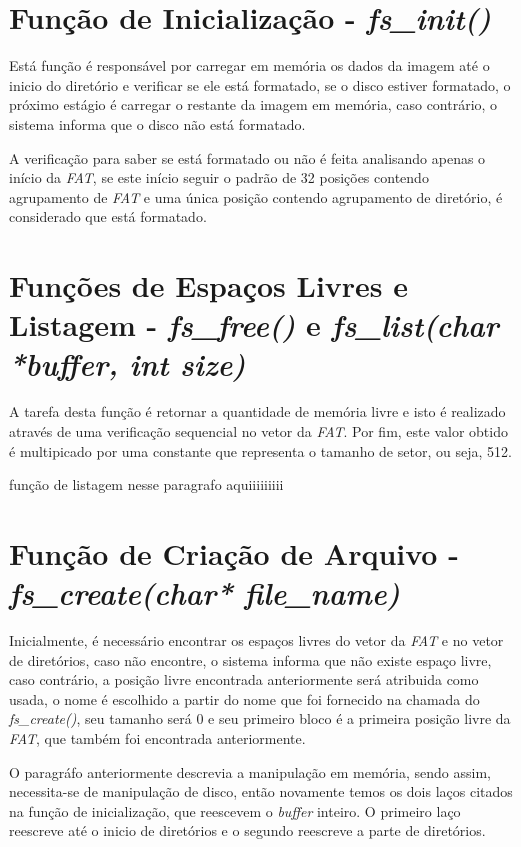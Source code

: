 \documentclass[11pt]{article}
\begin{document}
\section{Função de Inicialização -  \textit{fs\_init()}}
\par
Está função é responsável por carregar em memória os dados da imagem até o inicio do diretório e verificar se ele está formatado, se o disco estiver formatado, o próximo estágio é carregar o restante da imagem em memória, caso contrário, o sistema informa que o disco não está formatado. 
\par
A verificação para saber se está formatado ou não é feita analisando apenas o início da \textit{FAT}, se este início seguir o padrão de 32 posições contendo agrupamento de \textit{FAT} e uma única posição contendo agrupamento de diretório, é considerado que está formatado.

\section{Funções de Espaços Livres e Listagem -  \textit{fs\_free()} e  \textit{fs\_list(char *buffer, int size)}}
\par
A tarefa desta função é retornar a quantidade de memória livre e isto é realizado através de uma verificação sequencial no vetor da \textit{FAT}. Por fim, este valor obtido é multipicado por uma constante que representa o tamanho de setor, ou seja, 512.
\par
função de listagem nesse paragrafo aquiiiiiiiii

\section{Função de Criação de Arquivo - \textit{fs\_create(char* file\_name)}}
\par
Inicialmente, é necessário encontrar os espaços livres do vetor da \textit{FAT} e no vetor de diretórios, caso não encontre, o sistema informa que não existe espaço livre, caso contrário, a posição livre encontrada anteriormente será atribuida como usada, o nome é escolhido a partir do nome que foi fornecido na chamada do \textit{fs\_create()}, seu tamanho será 0 e seu primeiro bloco é a primeira posição livre da \textit{FAT}, que também foi encontrada anteriormente.
\par
O paragráfo anteriormente descrevia a manipulação em memória, sendo assim, necessita-se de manipulação de disco, então novamente temos os dois laços citados na função de inicialização, que reescevem o \textit{buffer} inteiro. O primeiro laço reescreve até o inicio de diretórios e o segundo reescreve a parte de diretórios.
\end{document}
